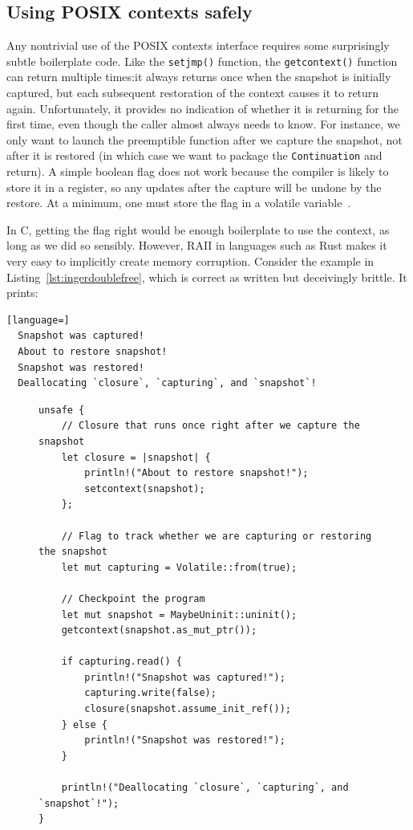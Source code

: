 \subsection{Using POSIX contexts safely}
\label{sec:libinger:boilerplate}

Any nontrivial use of the POSIX contexts interface requires some surprisingly subtle
boilerplate code.  Like the \texttt{setjmp()} function, the
\texttt{getcontext()} function can return multiple times:\@ it always returns once
when the snapshot is initially captured, but each subsequent restoration of the
context causes it to return again.  Unfortunately, it provides no indication of
whether it is returning for the first time, even though the caller almost always
needs to know.  For instance, we only want to launch the preemptible function after
we capture the snapshot, not after it is restored (in which case we want to package
the \texttt{Continuation} and return).  A simple boolean flag does not work because
the compiler is likely to store it in a register, so any updates after the capture
will be undone by the restore.  At a minimum, one must store the flag in a volatile
variable~\cite{getcontext-manpage}.

In C, getting the flag right would be enough boilerplate to use the context, as long
as we did so sensibly.  However, RAII in languages such as Rust makes it very easy to
implicitly create memory corruption.  Consider the example in
Listing~\ref{lst:ingerdoublefree}, which is correct as written but deceivingly
brittle.  It prints:
\begin{lstlisting}[language=]
  Snapshot was captured!
  About to restore snapshot!
  Snapshot was restored!
  Deallocating `closure`, `capturing`, and `snapshot`!
\end{lstlisting}

\begin{figure}
\begin{lstlisting}[label=lst:ingerdoublefree,caption=Subtly unsound use of POSIX contexts from Rust,morekeywords={let,mut,unsafe}]
unsafe {
	// Closure that runs once right after we capture the snapshot
	let closure = |snapshot| {
		println!("About to restore snapshot!");
		setcontext(snapshot);
	};

	// Flag to track whether we are capturing or restoring the snapshot
	let mut capturing = Volatile::from(true);

	// Checkpoint the program
	let mut snapshot = MaybeUninit::uninit();
	getcontext(snapshot.as_mut_ptr());

	if capturing.read() {
		println!("Snapshot was captured!");
		capturing.write(false);
		closure(snapshot.assume_init_ref());
	} else {
		println!("Snapshot was restored!");
	}

	println!("Deallocating `closure`, `capturing`, and `snapshot`!");
}
\end{lstlisting}
\end{figure}

